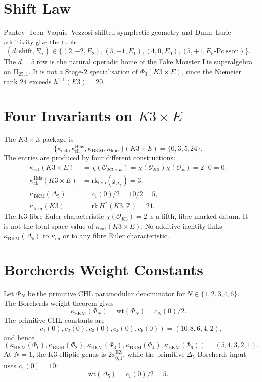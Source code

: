 \documentclass[11pt]{article}
\providecommand{\Z}{\mathbb{Z}}
\providecommand{\kch}{\kappa_{\mathrm{ch}}}
\providecommand{\kcat}{\kappa_{\mathrm{cat}}}
\providecommand{\kBKM}{\kappa_{\mathrm{BKM}}}
\providecommand{\kfib}{\kappa_{\mathrm{fiber}}}
\providecommand{\Eone}{E_1}
\providecommand{\Etwo}{E_2}
\providecommand{\fg}{\mathfrak{g}}
\providecommand{\cO}{\mathcal{O}}
\providecommand{\fgDel}{\fg_{\Delta_5}}
\theoremstyle{plain}
\theoremstyle{definition}
\theoremstyle{remark}
\begin{document}
\section{Shift Law}

Pantev--Toen--Vaquie--Vezzosi shifted symplectic geometry and
Dunn--Lurie additivity give the table
\[
  (d,\mathrm{shift},E_n^{\mathrm{cl}})
  \in
  \{(2,-2,\Etwo),(3,-1,\Eone),(4,0,E_0),(5,+1,E_5\text{-Poisson})\}.
\]
The $d=5$ row is the natural operadic home of the Fake Monster Lie
superalgebra on $\mathrm{II}_{25,1}$.  It is not a Stage-$2$
specialisation of $\Phi_3(K3\times E)$, since the Niemeier rank $24$
exceeds $h^{1,1}(K3)=20$.

\section{Four Invariants on \texorpdfstring{$K3\times E$}{K3xE}}

The $K3\times E$ package is
\[
  \{\kcat,\kch^{\mathrm{Heis}},\kBKM,\kfib\}(K3\times E)
  =
  \{0,3,5,24\}.
\]
The entries are produced by four different constructions:
\begin{align*}
\kcat(K3\times E)
  &= \chi(\cO_{K3\times E})
   = \chi(\cO_{K3})\chi(\cO_E)=2\cdot 0=0,\\
\kch^{\mathrm{Heis}}(K3\times E)
  &= \mathrm{rk}_{\mathrm{hyp}}(\fgDel)=3,\\
\kBKM(\Delta_5)
  &= c_1(0)/2=10/2=5,\\
\kfib(K3)
  &= \mathrm{rk}\,H^*(K3,\Z)=24.
\end{align*}
The K3-fibre Euler characteristic $\chi(\cO_{K3})=2$ is a fifth,
fibre-marked datum.  It is not the total-space value of
$\kcat(K3\times E)$.  No additive identity links
$\kBKM(\Delta_5)$ to $\kch$ or to any fibre Euler characteristic.

\section{Borcherds Weight Constants}

Let $\Phi_N$ be the primitive CHL paramodular denominator for
$N\in\{1,2,3,4,6\}$.  The Borcherds weight theorem gives
\[
  \kBKM(\Phi_N)=\mathrm{wt}(\Phi_N)=c_N(0)/2.
\]
The primitive CHL constants are
\[
  (c_1(0),c_2(0),c_3(0),c_4(0),c_6(0))
    =(10,8,6,4,2),
\]
and hence
\[
  (\kBKM(\Phi_1),\kBKM(\Phi_2),\kBKM(\Phi_3),
   \kBKM(\Phi_4),\kBKM(\Phi_6))
    =(5,4,3,2,1).
\]
At $N=1$, the K3 elliptic genus is $2\phi_{0,1}^{\mathrm{EZ}}$, while
the primitive $\Delta_5$ Borcherds input uses $c_1(0)=10$:
\[
  \mathrm{wt}(\Delta_5)=c_1(0)/2=5.
\]
\end{document}
